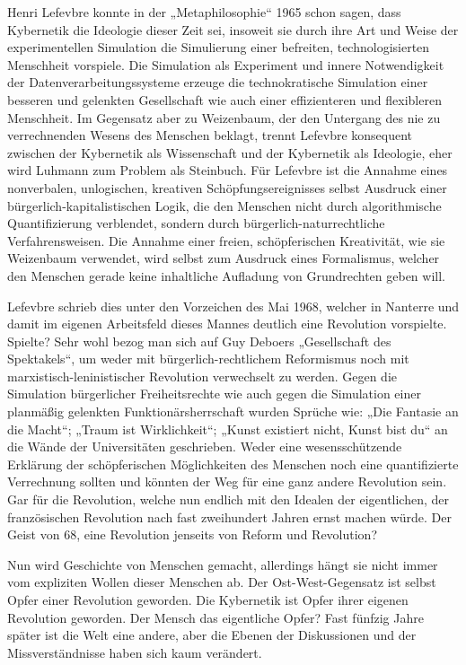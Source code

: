 \documentclass[a4paper,11pt]{article}
\begin{document}
Henri Lefevbre konnte in der „Metaphilosophie“ 1965 schon sagen, dass
Kybernetik die Ideologie dieser Zeit sei, insoweit sie durch ihre Art und
Weise der experimentellen Simulation die Simulierung einer befreiten,
technologisierten Menschheit vorspiele. Die Simulation als Experiment und
innere Notwendigkeit der Datenverarbeitungssysteme erzeuge die technokratische
Simulation einer besseren und gelenkten Gesellschaft wie auch einer
effizienteren und flexibleren Menschheit. Im Gegensatz aber zu Weizenbaum, der
den Untergang des nie zu verrechnenden Wesens des Menschen beklagt, trennt
Lefevbre konsequent zwischen der Kybernetik als Wissenschaft und der
Kybernetik als Ideologie, eher wird Luhmann zum Problem als Steinbuch. Für
Lefevbre ist die Annahme eines nonverbalen, unlogischen, kreativen
Schöpfungsereignisses selbst Ausdruck einer bürgerlich-kapitalistischen Logik,
die den Menschen nicht durch algorithmische Quantifizierung verblendet,
sondern durch bürgerlich-naturrechtliche Verfahrensweisen. Die Annahme einer
freien, schöpferischen Kreativität, wie sie Weizenbaum verwendet, wird selbst
zum Ausdruck eines Formalismus, welcher den Menschen gerade keine inhaltliche
Aufladung von Grundrechten geben will.

Lefevbre schrieb dies unter den Vorzeichen des Mai 1968, welcher in Nanterre
und damit im eigenen Arbeitsfeld dieses Mannes deutlich eine Revolution
vorspielte. Spielte? Sehr wohl bezog man sich auf Guy Deboers „Gesellschaft
des Spektakels“, um weder mit bürgerlich-rechtlichem Reformismus noch mit
marxistisch-leninistischer Revolution verwechselt zu werden. Gegen die
Simulation bürgerlicher Freiheitsrechte wie auch gegen die Simulation einer
planmäßig gelenkten Funktionärsherrschaft wurden Sprüche wie: „Die Fantasie an
die Macht“; „Traum ist Wirklichkeit“; „Kunst existiert nicht, Kunst bist du“
an die Wände der Universitäten geschrieben. Weder eine wesensschützende
Erklärung der schöpferischen Möglichkeiten des Menschen noch eine
quantifizierte Verrechnung sollten und könnten der Weg für eine ganz andere
Revolution sein. Gar für die Revolution, welche nun endlich mit den Idealen
der eigentlichen, der französischen Revolution nach fast zweihundert Jahren
ernst machen würde. Der Geist von 68, eine Revolution jenseits von Reform und
Revolution?

Nun wird Geschichte von Menschen gemacht, allerdings hängt sie nicht immer vom
expliziten Wollen dieser Menschen ab. Der Ost-West-Gegensatz ist selbst Opfer
einer Revolution geworden. Die Kybernetik ist Opfer ihrer eigenen Revolution
geworden. Der Mensch das eigentliche Opfer? Fast fünfzig Jahre später ist die
Welt eine andere, aber die Ebenen der Diskussionen und der Missverständnisse
haben sich kaum verändert.
\end{document}
